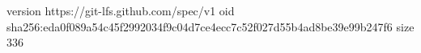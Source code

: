 version https://git-lfs.github.com/spec/v1
oid sha256:eda0f089a54c45f2992034f9c04d7ce4ecc7c52f027d55b4ad8be39e99b247f6
size 336
